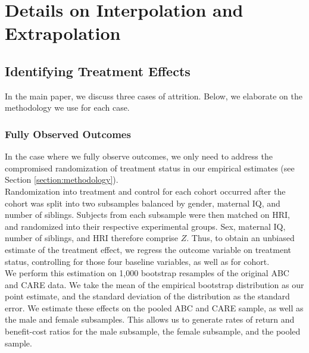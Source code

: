 \section{Details on Interpolation and Extrapolation} \label{appendix:methodology}

\subsection{Identifying Treatment Effects}
\label{app:method_identify}

\noindent In the main paper, we discuss three cases of attrition. Below, we elaborate on the methodology we use for each case. \\

\subsubsection{Fully Observed Outcomes}
\label{app:method_fullobs}

\noindent  In the case where we fully observe outcomes, we only need to address the compromised randomization
of treatment status in our empirical estimates (see Section \ref{section:methodology}). \\

\noindent Randomization into treatment and control for each cohort occurred after the cohort was split
into two subsamples balanced by gender, maternal IQ,
and number of siblings. Subjects from each subsample were then matched on HRI, and randomized
into their respective experimental groups. Sex, maternal IQ, number of siblings, and HRI
therefore comprise $Z$. Thus, to obtain an
unbiased estimate of the treatment effect, we regress the outcome variable on treatment status,
controlling for those four baseline variables, as well as for cohort. \\

\noindent We perform this estimation on 1,000 bootstrap resamples of the original ABC and CARE data. We take the
mean of the empirical bootstrap distribution as our point estimate, and the standard deviation
of the distribution as the standard error. We estimate these effects on the
pooled ABC and CARE sample, as well as the male and female subsamples. This allows us to generate
rates of return and benefit-cost ratios for the male subsample, the female subsample, and the pooled sample. \\


